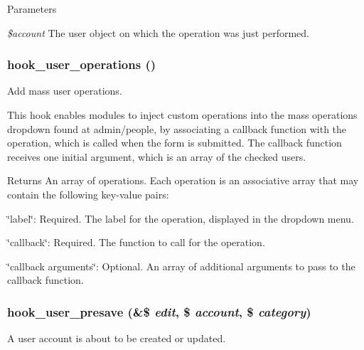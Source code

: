 \begin{DoxyParams}{Parameters}
\item[{\em \$account}]The user object on which the operation was just performed. \end{DoxyParams}
\hypertarget{group__hooks_ga1b2c2630f79b64b0673d0a9a0983f447}{
\subsubsection[{hook\_\-user\_\-operations}]{\setlength{\rightskip}{0pt plus 5cm}hook\_\-user\_\-operations ()}}
\label{group__hooks_ga1b2c2630f79b64b0673d0a9a0983f447}
Add mass user operations.

This hook enables modules to inject custom operations into the mass operations dropdown found at admin/people, by associating a callback function with the operation, which is called when the form is submitted. The callback function receives one initial argument, which is an array of the checked users.

\begin{DoxyReturn}{Returns}
An array of operations. Each operation is an associative array that may contain the following key-\/value pairs:
\begin{DoxyItemize}
\item \char`\"{}label\char`\"{}: Required. The label for the operation, displayed in the dropdown menu.
\item \char`\"{}callback\char`\"{}: Required. The function to call for the operation.
\item \char`\"{}callback arguments\char`\"{}: Optional. An array of additional arguments to pass to the callback function. 
\end{DoxyItemize}
\end{DoxyReturn}
\hypertarget{group__hooks_gab6b224c35d7d97259d4350a7849f1e56}{
\subsubsection[{hook\_\-user\_\-presave}]{\setlength{\rightskip}{0pt plus 5cm}hook\_\-user\_\-presave (\&\$ {\em edit}, \/  \$ {\em account}, \/  \$ {\em category})}}
\label{group__hooks_gab6b224c35d7d97259d4350a7849f1e56}
A user account is about to be created or updated.

